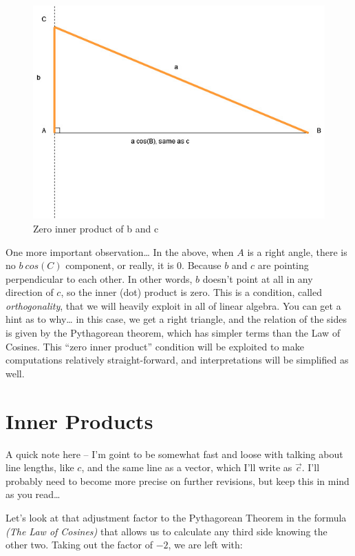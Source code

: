 \documentclass[
]{book}
\begin{document}
\begin{figure}

{\centering \includegraphics[width=0.75\linewidth,height=0.75\textheight]{images/Triangles-bcosA-rightTriangle} 

}

\caption{Zero inner product of b and c}\label{fig:unnamed-chunk-3}
\end{figure}

One more important observation\ldots{} In the above, when \(A\) is a right angle, there is no \(b\ cos(C)\) component, or really, it is 0. Because \(b\) and \(c\) are pointing perpendicular to each other. In other words, \(b\) doesn't point at all in any direction of \(c\), so the inner (dot) product is zero. This is a condition, called \emph{orthogonality}, that we will heavily exploit in all of linear algebra. You can get a hint as to why\ldots{} in this case, we get a right triangle, and the relation of the sides is given by the Pythagorean theorem, which has simpler terms than the Law of Cosines. This ``zero inner product'' condition will be exploited to make computations relatively straight-forward, and interpretations will be simplified as well.

\hypertarget{inner-products}{%
\section{Inner Products}\label{inner-products}}

A quick note here -- I'm goint to be somewhat fast and loose with talking about line lengths, like \(c\), and the same line as a vector, which I'll write as \(\vec{c}\). I'll probably need to become more precise on further revisions, but keep this in mind as you read\ldots{}

Let's look at that adjustment factor to the Pythagorean Theorem in the formula \emph{(The Law of Cosines)} that allows us to calculate any third side knowing the other two. Taking out the factor of \(-2\), we are left with:
\end{document}
